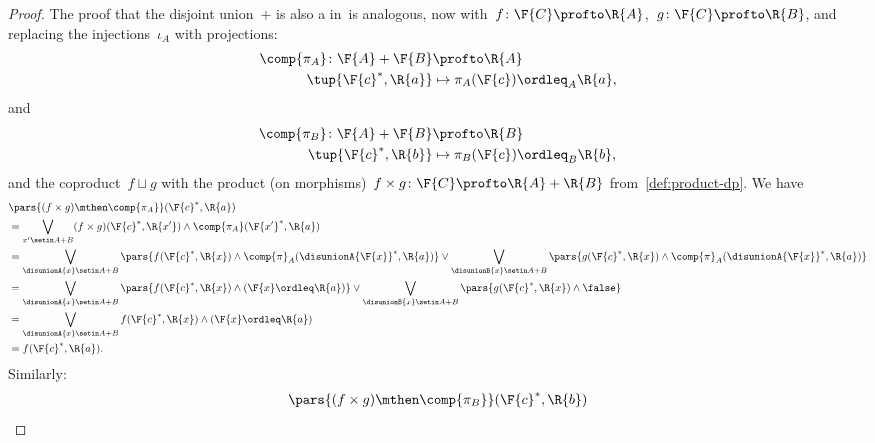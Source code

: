 \begin{proof}
    The proof that the disjoint union~$+$ is also a  in~\DP is analogous, now with~$f \colon \F{C} \profto \R{A}$,~$g \colon \F{C} \profto \R{B}$, and replacing the injections~$\iota_A$ with projections:
    \begin{equation}
        \begin{aligned}
            \comp{\pi_A} \colon \F{A}+\F{B} & \profto \R{A} \\
            \tup{\F{c}^*,\R{a}}             & \mapsto \pi_A(\F{c})\ordleq_A \R{a},
        \end{aligned}
    \end{equation}
    and
    \begin{equation}
        \begin{aligned}
            \comp{\pi_B} \colon \F{A}+\F{B} & \profto \R{B} \\
            \tup{\F{c}^*,\R{b}}             & \mapsto \pi_B(\F{c})\ordleq_B \R{b},
        \end{aligned}
    \end{equation}
    and the coproduct~$f \sqcup g$ with the product (on morphisms)~$f \times g \colon \F{C} \profto \R{A} + \R{B}$ from~\cref{def:product-dp}.
    We have
    \begin{equation}
        \begin{aligned}
             & \pars{(f\times g)\mthen \comp{\pi_A}}(\F{c}^*,\R{a}) \\
             & =\bigvee_{x'\setin A+B} (f\times g)(\F{c}^*,\R{x'}) \wedge \comp{\pi_A}(\F{x'}^*,\R{a}) \\
             & =\bigvee_{\disunionA{x}\setin A+B}\pars{ f(\F{c}^*,\R{x}) \wedge \comp{\pi}_A(\disunionA{\F{x}}^*,\R{a})} \vee
            \bigvee_{\disunionB{x}\setin A+B}\pars{ g(\F{c}^*,\R{x}) \wedge \comp{\pi}_A(\disunionA{\F{x}}^*,\R{a})} \\
             & =\bigvee_{\disunionA{x}\setin A+B}\pars{ f(\F{c}^*,\R{x}) \wedge (\F{x}\ordleq \R{a})} \vee
            \bigvee_{\disunionB{x}\setin A+B}\pars{ g(\F{c}^*,\R{x}) \wedge \false } \\
             & =\bigvee_{\disunionA{x}\setin A+B} f(\F{c}^*,\R{x}) \wedge (\F{x}\ordleq \R{a}) \\
             & =f(\F{c}^*,\R{a}).
        \end{aligned}
    \end{equation}
    Similarly:
    \begin{equation}
        \begin{aligned}
             & \pars{(f\times g)\mthen \comp{\pi_B}}(\F{c}^*,\R{b}) \\

\end{aligned}
\end{equation}
\end{proof}
